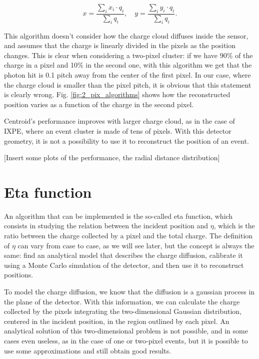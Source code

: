 \begin{equation}
x = \frac{\sum_i x_i \cdot q_i}{\sum_i q_i}, \quad y = \frac{\sum_i y_i \cdot q_i}{\sum_i q_i}.
\end{equation}

This algorithm doesn't consider how the charge cloud diffuses inside the sensor, and assumes that the charge is linearly divided in the pixels as the position changes. This is clear when considering a two-pixel cluster: if we have 90\% of the charge in a pixel and 10\% in the second one, with this algorithm we get that the photon hit is 0.1 pitch away from the center of the first pixel. In our case, where the charge cloud is smaller than the pixel pitch, it is obvious that this statement is clearly wrong. Fig. \ref{fig:2_pix_algorithms} shows how the reconstructed position varies as a function of the charge in the second pixel.

Centroid's performance improves with larger charge cloud, as in the case of IXPE, where an event cluster is made of tens of pixels. With this detector geometry, it is not a possibility to use it to reconstruct the position of an event.

[Insert some plots of the performance, the radial distance distribution]


\section{Eta function}

An algorithm that can be implemented is the so-called eta function, which consists in studying the relation between the incident position and $\eta$, which is the ratio between the charge collected by a pixel and the total charge. The definition of $\eta$ can vary from case to case, as we will see later, but the concept is always the same: find an analytical model that describes the charge diffusion, calibrate it using a Monte Carlo simulation of the detector, and then use it to reconstruct positions.

To model the charge diffusion, we know that the diffusion is a gaussian process in the plane of the detector. With this information, we can calculate the charge collected by the pixels integrating the two-dimensional Gaussian distribution, centered in the incident position, in the region outlined by each pixel. An analytical solution of this two-dimensional problem is not possible, and in some cases even useless, as in the case of one or two-pixel events, but it is possible to use some approximations and still obtain good results.

